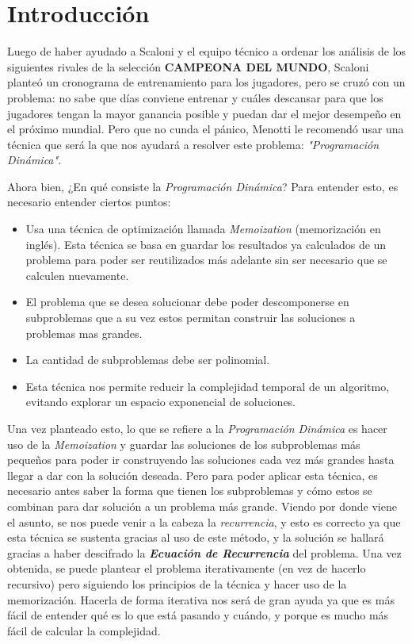 \section{Introducción}

Luego de haber ayudado a Scaloni y el equipo técnico a ordenar los análisis de los siguientes rivales de la selección \textbf{CAMPEONA DEL MUNDO}, Scaloni planteó un cronograma de entrenamiento para los jugadores, pero se cruzó con un problema: no sabe que días conviene entrenar y cuáles descansar para que los jugadores tengan la mayor ganancia posible y puedan dar el mejor desempeño en el próximo mundial. Pero que no cunda el pánico, Menotti le recomendó usar una técnica que será la que nos ayudará a resolver este problema: \textit{"Programación Dinámica"}.

Ahora bien, ¿En qué consiste la \textit{Programación Dinámica}? Para entender esto, es necesario entender ciertos puntos:
\begin{itemize}
    \item Usa una técnica de optimización llamada \textit{Memoization} (memorización en inglés). Esta técnica se basa en guardar los resultados ya calculados de un problema para poder ser reutilizados más adelante sin ser necesario que se calculen nuevamente.
    \item El problema que se desea solucionar debe poder descomponerse en subproblemas que a su vez estos permitan construir las soluciones a problemas mas grandes.
    \item La cantidad de subproblemas debe ser polinomial.
    \item Esta técnica nos permite reducir la complejidad temporal de un algoritmo, evitando explorar un espacio exponencial de soluciones.
\end{itemize}
Una vez planteado esto, lo que se refiere a la \textit{Programación Dinámica} es hacer uso de la \textit{Memoization} y guardar las soluciones de los subproblemas más pequeños para poder ir construyendo las soluciones cada vez más grandes hasta llegar a dar con la solución deseada. Pero para poder aplicar esta técnica, es necesario antes saber la forma que tienen los subproblemas y cómo estos se combinan para dar solución a un problema más grande. 
Viendo por donde viene el asunto, se nos puede venir a la cabeza la \textit{recurrencia}, y esto es correcto ya que esta técnica se sustenta gracias al uso de este método, y la solución se hallará gracias a haber descifrado la \textbf{\textit{Ecuación de Recurrencia}} del problema. Una vez obtenida, se puede plantear el problema iterativamente (en vez de hacerlo recursivo) pero siguiendo los principios de la técnica y hacer uso de la memorización. Hacerla de forma iterativa nos será de gran ayuda ya que es más fácil de entender qué es lo que está pasando y cuándo, y porque es mucho más fácil de calcular la complejidad.

